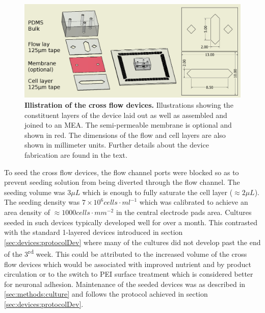  \begin{figure}[h]
       \centering
       \includegraphics[width=12cm]{chapter5/figures/crossFlowIllustration/crossFlowIllustration.jpg}
       \caption[Illustration of the cross flow devices used for measuring culture activity under flow]{\textbf{Illistration of the cross flow devices.} Illustrations showing the constituent layers of the device laid out as well as assembled and joined to an MEA. The semi-permeable membrane is optional and shown in red. The dimensions of the flow and cell layers are also shown in millimeter units. Further details about the device fabrication are found in the text.}
       \label{fig:crossFlow:crossFlowIllustration}
  \end{figure}

To seed the cross flow devices, the flow channel ports were blocked so as to prevent seeding solution from being diverted through the flow channel. The seeding volume was \(3 \mu L\) which is enough to fully saturate the cell layer (\(\approx 2 \mu L\)). The seeding density was \(7\times 10^6 cells\cdot ml^{-1}\) which was calibrated to achieve an area density of \(\approx 1000 cells\cdot mm^{-2}\) in the central electrode pads area. Cultures seeded in such devices typically developed well for over a month. This contrasted with the standard 1-layered devices introduced in section \ref{sec:devices:protocolDev} where many of the cultures did not develop past the end of the 3\textsuperscript{rd} week. This could be attributed to the increased volume of the cross flow devices which would be associated with improved nutrient and by product circulation or to the switch to PEI surface treatment which is considered better for neuronal adhesion. Maintenance of the seeded devices was as described in \ref{sec:methods:culture} and follows the protocol achieved in section \ref{sec:devices:protocolDev}.



